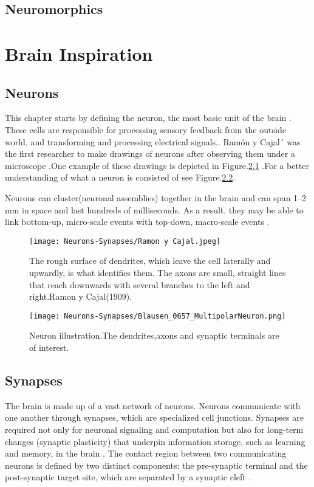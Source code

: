 \documentclass{report}
\begin{document}
\section{Neuromorphics}
\chapter{Brain Inspiration}
\section{Neurons}
This chapter starts by defining the neuron, the most basic unit of the brain \cite{gerstner2014}. These cells are responsible for processing sensory feedback from the outside world, and transforming and processing electrical signals.\cite{balduzzi2013}. Ramón y Cajal´ was the first researcher to make drawings of neurons after observing them under a microscope\cite{garcialopezp2010}
.One example of these drawings is depicted in Figure.\ref{fig:neurons-ramoncajal} .For a better understanding of what a neuron is consisted of see Figure.\ref{fig:neurons-multipolar}.

Neurons can cluster(neuronal assemblies) together in the brain and can span 1–2 mm in space and last hundreds of milliseconds. As a result, they may be able to link bottom-up, micro-scale events with top-down, macro-scale events \cite{Badin2017} .

\begin{figure}[htp]
    \centering
    \texttt{[image: Neurons-Synapses/Ramon y Cajal.jpeg]}
    \caption{The rough surface of dendrites, which leave the cell laterally and upwardly, is what identifies them. The axons are small, straight lines that reach downwards with several branches to the left and right.Ramon y Cajal(1909).}
    \label{fig:neurons-ramoncajal}
\end{figure}
\begin{figure}[htp]
    \centering
    \texttt{[image: Neurons-Synapses/Blausen\_0657\_MultipolarNeuron.png]}
    \caption{Neuron illustration.The dendrites,axons and synaptic terminals are of interest.}
    \label{fig:neurons-multipolar}
\end{figure}
\section{Synapses}
The brain is made up of a vast network of neurons. Neurons communicate with one another through synapses, which are specialized cell junctions. Synapses are required not only for neuronal signaling and computation but also for long-term changes (synaptic plasticity) that underpin information storage, such as learning and memory, in the brain  \cite{li2003}. The contact region between two communicating neurons is defined by two distinct components: the pre-synaptic terminal and the post-synaptic target site, which are separated by a synaptic cleft .
\end{document}
